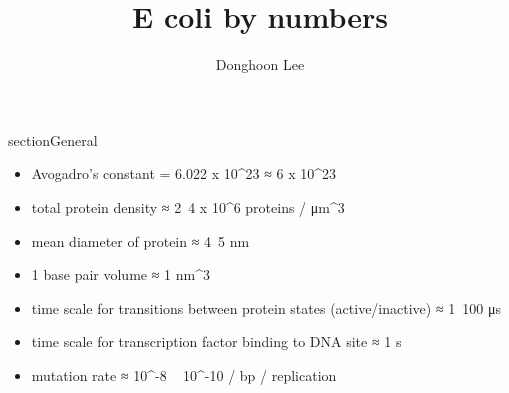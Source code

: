 \documentclass{article}
\title{E coli by numbers}
\author{Donghoon Lee}
\begin{document}
    \maketitle

    section{General}

    \begin{itemize}
        \item Avogadro's constant = 6.022 x 10^{23} ≈ 6 x 10^{23}
        \item total protein density ≈ 2~4 x 10^{6} proteins / μm^{3}
        \item mean diameter of protein ≈ 4~5 nm
        \item 1 base pair volume ≈ 1 nm^{3}
        \item time scale for transitions between protein states (active/inactive) ≈ 1~100 μs
        \item time scale for transcription factor binding to DNA site ≈ 1 s
        \item mutation rate ≈ 10^{-8} ~ 10^{-10} / bp / replication
    \end{itemize}
\end{document}
